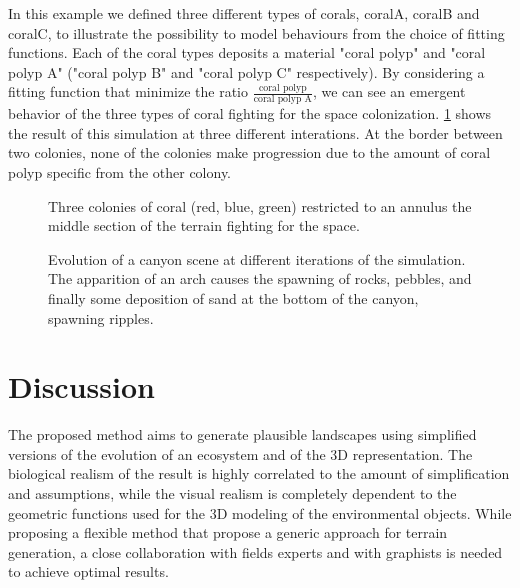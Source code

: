 In this example we defined three different types of corals, coralA, coralB and coralC, to illustrate the possibility to model behaviours from the choice of fitting functions. Each of the coral types deposits a material "coral polyp" and "coral polyp A" ("coral polyp B" and "coral polyp C" respectively). By considering a fitting function that minimize the ratio $\frac{\text{coral polyp}}{\text{coral polyp A}}$, we can see an emergent behavior of the three types of coral fighting for the space colonization.
\cref{fig:env-obj-coral-colonization-scene} shows the result of this simulation at three different interations. At the border between two colonies, none of the colonies make progression due to the amount of coral polyp specific from the other colony.

\begin{figure}
    \caption{Three colonies of coral (red, blue, green) restricted to an annulus the middle section of the terrain fighting for the space.}
    \label{fig:env-obj-coral-colonization-scene}
\end{figure}

\begin{figure}
    \caption{Evolution of a canyon scene at different iterations of the simulation. The apparition of an arch causes the spawning of rocks, pebbles, and finally some deposition of sand at the bottom of the canyon, spawning ripples. }
    \label{fig:env-obj-canyon-scene}
\end{figure}



\section{Discussion}
\label{sec:env-obj-discussion}
The proposed method aims to generate plausible landscapes using simplified versions of the evolution of an ecosystem and of the 3D representation. The biological realism of the result is highly correlated to the amount of simplification and assumptions, while the visual realism is completely dependent to the geometric functions used for the 3D modeling of the environmental objects. While proposing a flexible method that propose a generic approach for terrain generation, a close collaboration with fields experts and with graphists is needed to achieve optimal results.

